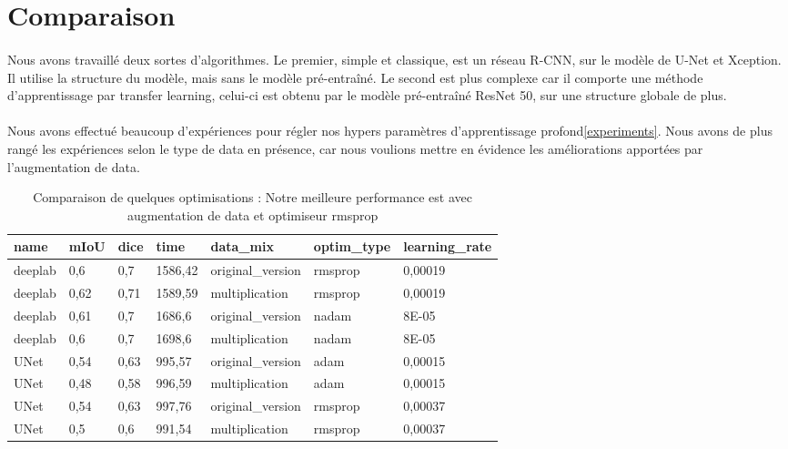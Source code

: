\documentclass[
10pt, %
a4paper, %
oneside, %
headinclude,footinclude, %
]{scrartcl}
\begin{document}
\section{Comparaison}
\paragraph{}Nous avons travaillé deux sortes d’algorithmes. Le premier, simple et classique, est un réseau R-CNN, sur le modèle de U-Net et Xception. Il utilise la structure du modèle, mais sans le modèle pré-entraîné. Le second est plus complexe car il comporte une méthode d’apprentissage par transfer learning, celui-ci est obtenu par le modèle pré-entraîné ResNet 50, sur une structure globale de  plus.
\paragraph{}Nous avons effectué beaucoup d’expériences pour régler nos hypers paramètres d’apprentissage profond\ref{experiments}. Nous avons de plus rangé les expériences selon le type de data en présence, car nous voulions mettre en évidence les améliorations apportées par l’augmentation de data.

\begin{table}[h]\center
\begin{tabular}{@{}lllllll@{}}
\toprule
name    & mIoU & dice & time    & data\_mix         & optim\_type & learning\_rate \\ \midrule
deeplab & 0,6  & 0,7  & 1586,42 & original\_version & rmsprop     & 0,00019        \\
deeplab & 0,62 & 0,71 & 1589,59 & multiplication    & rmsprop     & 0,00019        \\
deeplab & 0,61 & 0,7  & 1686,6  & original\_version & nadam       & 8E-05          \\
deeplab & 0,6  & 0,7  & 1698,6  & multiplication    & nadam       & 8E-05          \\
UNet    & 0,54 & 0,63 & 995,57  & original\_version & adam        & 0,00015        \\
UNet    & 0,48 & 0,58 & 996,59  & multiplication    & adam        & 0,00015        \\
UNet    & 0,54 & 0,63 & 997,76  & original\_version & rmsprop     & 0,00037        \\
UNet    & 0,5  & 0,6  & 991,54  & multiplication    & rmsprop     & 0,00037        \\ \bottomrule
\end{tabular}
\caption[Comparaison de quelques optimisations]{Comparaison de quelques optimisations : Notre meilleure performance est avec augmentation de data et optimiseur rmsprop}
\label{comparaison_table}
\end{table}
\end{document}
